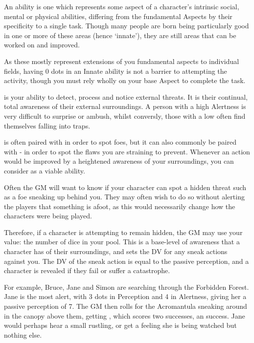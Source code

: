 An  ability is one which represents some aspect of a character's intrinsic social, mental or physical abilities, differing from the fundamental Aspects by their specificity to a single task. Though many people are born being particularly good in one or more of these areas (hence `innate'), they are still areas that can be worked on and improved. 

As these mostly represent extensions of you fundamental aspects to individual fields, having 0 dots in an Innate ability is not a barrier to attempting the activity, though you must rely wholly on your base Aspect to complete the task. 


 is your ability to detect, process and notice external threats. It is their continual, total awareness of their external surroundings. A person with a high Alertness is very difficult to surprise or ambush, whilst conversly, those with a low  often find themselves falling into traps.

 is often paired with  in order to spot foes, but it can also commonly be paired with  - in order to spot the flaws you are straining to prevent. Whenever an action would be improved by a heightened awareness of your surroundings, you can consider  as a viable ability. 



Often the GM will want to know if your character can spot a hidden threat such as a foe sneaking up behind you. They may often wish to do so without alerting the players that something is afoot, as this would necessarily change how the characters were being played. 

Therefore, if a character is attempting to remain hidden, the GM may use your  value: the number of dice in your  pool. This is a base-level of awareness that a character has of their surroundings, and sets the DV for any sneak actions against you. The DV of the sneak action is equal to the passive perception, and a character is revealed if they fail or suffer a catastrophe. 

For example, Bruce, Jane and Simon are searching through the Forbidden Forest. Jane is the most alert, with 3 dots in Perception and 4 in Alertness, giving her a passive perception of 7. The GM then rolls for the Acromantula sneaking around in the canopy above them, getting , which scores two successes, an  success. Jane would perhaps hear a small rustling, or get a feeling she is being watched but nothing else. 


